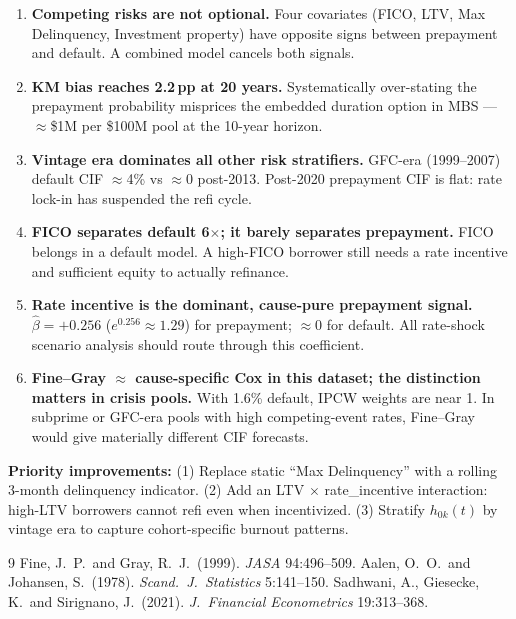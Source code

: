 \documentclass[11pt,a4paper]{article}
\begin{document}
\begin{enumerate}[leftmargin=1.6em,itemsep=3pt]

  \item \textbf{Competing risks are not optional.}
        Four covariates (FICO, LTV, Max Delinquency, Investment property) have opposite
        signs between prepayment and default. A combined model cancels both signals.

  \item \textbf{KM bias reaches 2.2\,pp at 20 years.}
        Systematically over-stating the prepayment probability misprices the embedded
        duration option in MBS --- $\approx$\$1M per \$100M pool at the 10-year horizon.

  \item \textbf{Vintage era dominates all other risk stratifiers.}
        GFC-era (1999--2007) default CIF $\approx$4\% vs $\approx$0 post-2013.
        Post-2020 prepayment CIF is flat: rate lock-in has suspended the refi cycle.

  \item \textbf{FICO separates default 6$\times$; it barely separates prepayment.}
        FICO belongs in a default model. A high-FICO borrower still needs a rate incentive
        and sufficient equity to actually refinance.

  \item \textbf{Rate incentive is the dominant, cause-pure prepayment signal.}
        $\hat\beta = +0.256$ ($e^{0.256} \approx 1.29$) for prepayment; $\approx 0$ for default.
        All rate-shock scenario analysis should route through this coefficient.

  \item \textbf{Fine--Gray $\approx$ cause-specific Cox in this dataset; the distinction matters in crisis pools.}
        With 1.6\% default, IPCW weights are near 1. In subprime or GFC-era pools
        with high competing-event rates, Fine--Gray would give materially different CIF forecasts.

\end{enumerate}

\vspace{0.5em}
\textbf{Priority improvements:}
(1) Replace static ``Max Delinquency'' with a rolling 3-month delinquency indicator.
(2) Add an LTV $\times$ rate\_incentive interaction: high-LTV borrowers cannot refi even when incentivized.
(3) Stratify $h_{0k}(t)$ by vintage era to capture cohort-specific burnout patterns.

\begin{thebibliography}{9}
\small
{}Fine, J.\ P.\ and Gray, R.\ J.\ (1999). \textit{JASA} 94:496--509.
Aalen, O.\ O.\ and Johansen, S.\ (1978). \textit{Scand.\ J.\ Statistics} 5:141--150.
Sadhwani, A., Giesecke, K.\ and Sirignano, J.\ (2021). \textit{J.\ Financial Econometrics} 19:313--368.
\end{thebibliography}
\end{document}
